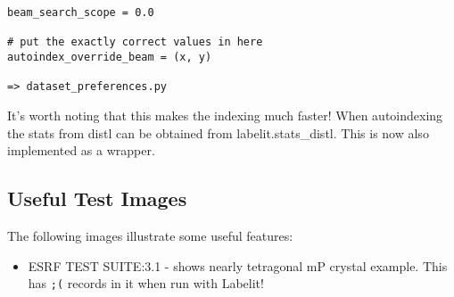 \documentclass[a4paper, 11pt]{article}
\begin{document}
{
\tiny
\begin{verbatim}
beam_search_scope = 0.0

# put the exactly correct values in here
autoindex_override_beam = (x, y) 

=> dataset_preferences.py

\end{verbatim}
}

It's worth noting that this makes the indexing much faster! When autoindexing
the stats from distl can be obtained from labelit.stats\_distl. This is 
now also implemented as a wrapper.

\subsection{Useful Test Images}

The following images illustrate some useful features:

\begin{itemize}
\item{ESRF TEST SUITE:3.1 - shows nearly tetragonal mP crystal example.
This has \verb|;(| records in it when run with Labelit!}
\end{itemize}
\end{document}
